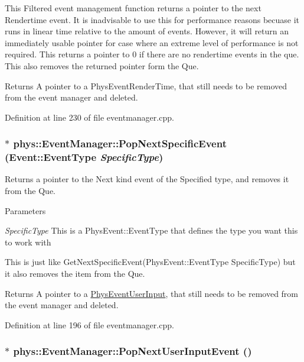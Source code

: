 This Filtered event management function returns a pointer to the next Rendertime event. It is inadvisable to use this for performance reasons becuase it runs in linear time relative to the amount of events. However, it will return an immediately usable pointer for case where an extreme level of performance is not required. This returns a pointer to 0 if there are no rendertime events in the que. This also removes the returned pointer form the Que. \begin{DoxyReturn}{Returns}
A pointer to a PhysEventRenderTime, that still needs to be removed from the event manager and deleted. 
\end{DoxyReturn}


Definition at line 230 of file eventmanager.cpp.

\hypertarget{classphys_1_1EventManager_ab96c53c888cdb6ed29ec0d2ce6e7b646}{
\subsubsection[{PopNextSpecificEvent}]{ $\ast$ phys::EventManager::PopNextSpecificEvent ({\bf Event::EventType} {\em SpecificType})}}
\label{da/dde/classphys_1_1EventManager_ab96c53c888cdb6ed29ec0d2ce6e7b646}


Returns a pointer to the Next kind event of the Specified type, and removes it from the Que. 


\begin{DoxyParams}{Parameters}
\item[{\em SpecificType}]This is a PhysEvent::EventType that defines the type you want this to work with\end{DoxyParams}
This is just like GetNextSpecificEvent(PhysEvent::EventType SpecificType) but it also removes the item from the Que. \begin{DoxyReturn}{Returns}
A pointer to a \hyperlink{classPhysEventUserInput}{PhysEventUserInput}, that still needs to be removed from the event manager and deleted. 
\end{DoxyReturn}


Definition at line 196 of file eventmanager.cpp.

\hypertarget{classphys_1_1EventManager_a32d29a1a66e1f77b758f08e31a922a5a}{
\subsubsection[{PopNextUserInputEvent}]{ $\ast$ phys::EventManager::PopNextUserInputEvent ()}}
\label{da/dde/classphys_1_1EventManager_a32d29a1a66e1f77b758f08e31a922a5a}


